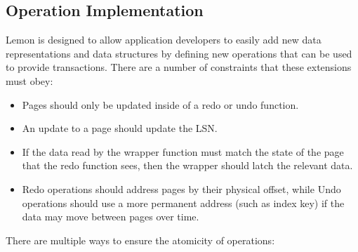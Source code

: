 \documentclass[letterpaper,twocolumn,english]{article}
\newcommand{\yad}{Lemon\xspace}
\begin{document}
%

\subsection{Operation Implementation}


\yad is designed to allow application developers to easily add new
data representations and data structures by defining new operations
that can be used to provide transactions.  There are a number of
constraints that these extensions must obey:

\begin{itemize}
\item Pages should only be updated inside of a redo or undo function.
\item An update to a page should update the LSN. 
\item If the data read by the wrapper function must match the state of
the page that the redo function sees, then the wrapper should latch
the relevant data.
\item Redo operations should address pages by their physical offset,
while Undo operations should use a more permanent address (such as
index key) if the data may move between pages over time.
\end{itemize}

There are multiple ways to ensure the atomicity of operations:
\end{document}
